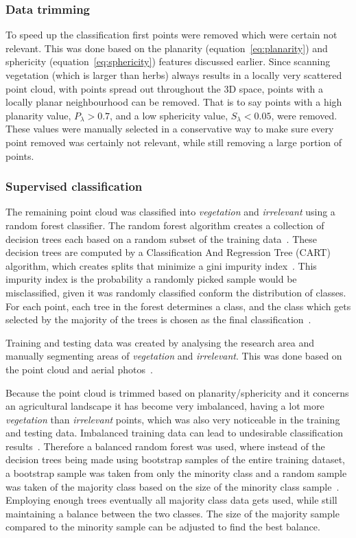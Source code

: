 {\subsubsection{Data trimming}
To speed up the classification first points were removed which were certain not relevant. This was done based on the planarity (equation~\ref{eq:planarity}) and sphericity (equation~\ref{eq:sphericity}) features discussed earlier. Since scanning vegetation (which is larger than herbs) always results in a locally very scattered point cloud, with points spread out throughout the 3D space, points with a locally planar neighbourhood can be removed. That is to say points with a high planarity value, \(P_{\lambda} > 0.7\), and a low sphericity value, \(S_{\lambda} < 0.05\), were removed. These values were manually selected in a conservative way to make sure every point removed was certainly not relevant, while still removing a large portion of points.
 
\subsubsection{Supervised classification}
The remaining point cloud was classified into \textit{vegetation} and \textit{irrelevant} using a random forest classifier. The random forest algorithm creates a collection of decision trees each based on a random subset of the training data~\citep{ho1998random}. These decision trees are computed by a Classification And Regression Tree (CART) algorithm, which creates splits that minimize a gini impurity index~\citep{breiman1984classification}. This impurity index is the probability a randomly picked sample would be misclassified, given it was randomly classified conform the distribution of classes. For each point, each tree in the forest determines a class, and the class which gets selected by the majority of the trees is chosen as the final classification~\citep{breiman2001random}.

Training and testing data was created by analysing the research area and manually segmenting areas of \textit{vegetation} and \textit{irrelevant}. This was done based on the point cloud and aerial photos~\citep{PDOK2015luchtfoto}. 

Because the point cloud is trimmed based on planarity/sphericity and it concerns an agricultural landscape it has become very imbalanced, having a lot more \textit{vegetation} than \textit{irrelevant} points, which was also very noticeable in the training and testing data. Imbalanced training data can lead to undesirable classification results~\citep{he2009learning}. Therefore a balanced random forest was used, where instead of the decision trees being made using bootstrap samples of the entire training dataset, a bootstrap sample was taken from only the minority class and a random sample was taken of the majority class based on the size of the minority class sample~\citep{Chen2004using}. Employing enough trees eventually all majority class data gets used, while still maintaining a balance between the two classes. The size of the majority sample compared to the minority sample can be adjusted to find the best balance.

}
